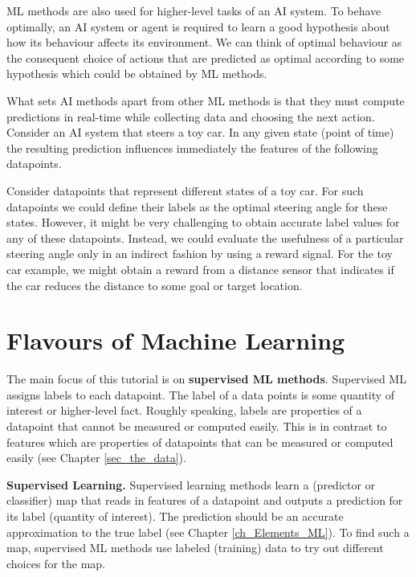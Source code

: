 \documentclass[12pt]{report}
\begin{document}
ML methods are also used for higher-level tasks of an AI system. 
To behave optimally, an AI system or agent is required to learn a 
good hypothesis about how its behaviour affects its environment. 
We can think of optimal behaviour as the consequent choice of actions 
that are predicted as optimal according to some hypothesis which 
could be obtained by ML methods. 


What sets AI methods apart from other ML methods is that they must 
compute predictions in real-time while collecting data and choosing 
the next action. Consider an AI system that steers a toy car. In any 
given state (point of time) the resulting prediction influences immediately 
the features of the following datapoints. 

Consider datapoints that represent different states of a toy car. 
For such datapoints we  could define their labels as the optimal 
steering angle for these states. However, it might be very challenging 
to obtain accurate label values for any of these datapoints. Instead, 
we could evaluate the usefulness of a particular steering angle only 
in an indirect fashion by using a reward signal. For the toy car example, 
we might obtain a reward from a distance sensor that indicates if the 
car reduces the distance to some goal or target location. 


\section{Flavours of Machine Learning} 

The main focus of this tutorial is on {\bf supervised ML methods}. 
Supervised ML assigns labels to each datapoint. The label of a data 
points is some quantity of interest or higher-level fact. Roughly 
speaking, labels are properties of a datapoint that cannot be 
measured or computed easily. This is in contrast to features which 
are properties of datapoints that can be measured or computed 
easily (see Chapter \ref{sec_the_data}). 

{\bf Supervised Learning.} Supervised learning methods learn 
a (predictor or classifier) map that reads in features of a datapoint 
and outputs a prediction for its label (quantity of interest). The 
prediction should be an accurate approximation to the true label 
(see Chapter \ref{ch_Elements_ML}). To find such a map, supervised 
ML methods use labeled (training) data to try out different choices for 
the map.  
\end{document}
